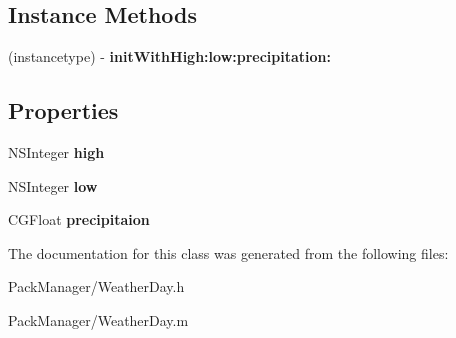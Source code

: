 \subsection*{Instance Methods}
\begin{DoxyCompactItemize}
\item 
\hypertarget{interface_weather_day_a6e633189e934d7878c4dfbc9239056e2}{(instancetype) -\/ {\bfseries init\-With\-High\-:low\-:precipitation\-:}}\label{interface_weather_day_a6e633189e934d7878c4dfbc9239056e2}

\end{DoxyCompactItemize}
\subsection*{Properties}
\begin{DoxyCompactItemize}
\item 
\hypertarget{interface_weather_day_a97d5aad192216fe0de9ebc43296cfb68}{N\-S\-Integer {\bfseries high}}\label{interface_weather_day_a97d5aad192216fe0de9ebc43296cfb68}

\item 
\hypertarget{interface_weather_day_a677798c5423dabd4861214c5de4faf55}{N\-S\-Integer {\bfseries low}}\label{interface_weather_day_a677798c5423dabd4861214c5de4faf55}

\item 
\hypertarget{interface_weather_day_a62a56a8c78976523287185d6dce106e1}{C\-G\-Float {\bfseries precipitaion}}\label{interface_weather_day_a62a56a8c78976523287185d6dce106e1}

\end{DoxyCompactItemize}


The documentation for this class was generated from the following files\-:\begin{DoxyCompactItemize}
\item 
Pack\-Manager/Weather\-Day.\-h\item 
Pack\-Manager/Weather\-Day.\-m\end{DoxyCompactItemize}
